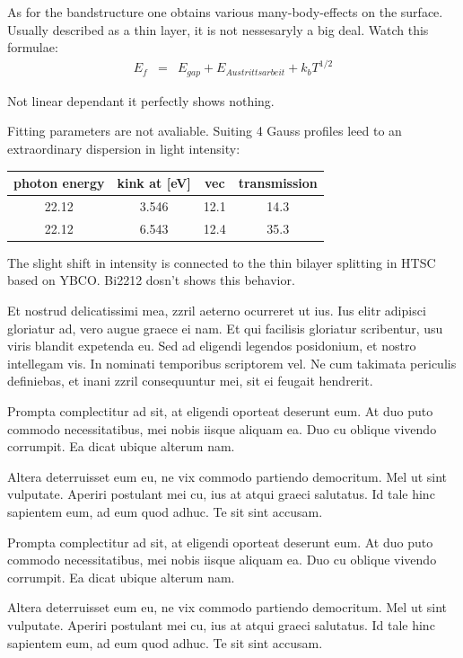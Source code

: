 \documentclass[11pt,twoside,german]{book}
\begin{document}
As for the bandstructure one obtains various many-body-effects on
the surface. Usually described as a thin layer, it is not nessesaryly
a big deal. Watch this formulae:
\begin{eqnarray*}
E_{f} & = & E_{gap}+E_{Austrittsarbeit}+k_{b}T^{1/2}
\end{eqnarray*}


Not linear dependant it perfectly shows nothing.

Fitting parameters are not avaliable. Suiting 4 Gauss profiles leed
to an extraordinary dispersion in light intensity:

\begin{center}
\begin{tabular}{|c|c|c|c|}
\hline 
photon energy&
kink at {[}eV{]}&
vec&
transmission\tabularnewline
\hline
\hline 
22.12&
3.546&
12.1&
14.3\tabularnewline
\hline 
22.12&
6.543&
12.4&
35.3\tabularnewline
\hline
\end{tabular}
\end{center}

The slight shift in intensity is connected to the thin bilayer splitting
in HTSC based on YBCO. Bi2212 dosn't shows this behavior.

Et nostrud delicatissimi mea, zzril aeterno ocurreret ut ius. Ius elitr adipisci gloriatur ad, vero augue graece ei nam. Et qui facilisis gloriatur scribentur, usu viris blandit expetenda eu. Sed ad eligendi legendos posidonium, et nostro intellegam vis. In nominati temporibus scriptorem vel. Ne cum takimata periculis definiebas, et inani zzril consequuntur mei, sit ei feugait hendrerit.

Prompta complectitur ad sit, at eligendi oporteat deserunt eum. At duo puto commodo necessitatibus, mei nobis iisque aliquam ea. Duo cu oblique vivendo corrumpit. Ea dicat ubique alterum nam.

Altera deterruisset eum eu, ne vix commodo partiendo democritum. Mel ut sint vulputate. Aperiri postulant mei cu, ius at atqui graeci salutatus. Id tale hinc sapientem eum, ad eum quod adhuc. Te sit sint accusam.

Prompta complectitur ad sit, at eligendi oporteat deserunt eum. At duo puto commodo necessitatibus, mei nobis iisque aliquam ea. Duo cu oblique vivendo corrumpit. Ea dicat ubique alterum nam.

Altera deterruisset eum eu, ne vix commodo partiendo democritum. Mel ut sint vulputate. Aperiri postulant mei cu, ius at atqui graeci salutatus. Id tale hinc sapientem eum, ad eum quod adhuc. Te sit sint accusam.
\newpage
\end{document}
